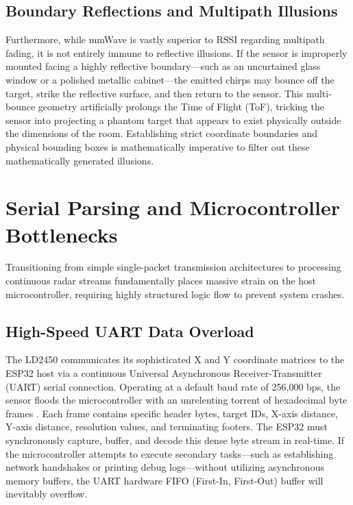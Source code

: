 \subsection{Boundary Reflections and Multipath Illusions}
Furthermore, while mmWave is vastly superior to RSSI regarding multipath fading, it is not entirely immune to reflective illusions. If the sensor is improperly mounted facing a highly reflective boundary—such as an uncurtained glass window or a polished metallic cabinet—the emitted chirps may bounce off the target, strike the reflective surface, and then return to the sensor. This multi-bounce geometry artificially prolongs the Time of Flight (ToF), tricking the sensor into projecting a phantom target that appears to exist physically outside the dimensions of the room. Establishing strict coordinate boundaries and physical bounding boxes is mathematically imperative to filter out these mathematically generated illusions.

\section{Serial Parsing and Microcontroller Bottlenecks}
Transitioning from simple single-packet transmission architectures to processing continuous radar streams fundamentally places massive strain on the host microcontroller, requiring highly structured logic flow to prevent system crashes.

\subsection{High-Speed UART Data Overload}
The LD2450 communicates its sophisticated X and Y coordinate matrices to the ESP32 host via a continuous Universal Asynchronous Receiver-Transmitter (UART) serial connection. Operating at a default baud rate of 256,000 bps, the sensor floods the microcontroller with an unrelenting torrent of hexadecimal byte frames \cite{hi-link-ld2450-datasheet}. Each frame contains specific header bytes, target IDs, X-axis distance, Y-axis distance, resolution values, and terminating footers. The ESP32 must synchronously capture, buffer, and decode this dense byte stream in real-time. If the microcontroller attempts to execute secondary tasks—such as establishing network handshakes or printing debug logs—without utilizing asynchronous memory buffers, the UART hardware FIFO (First-In, First-Out) buffer will inevitably overflow.

